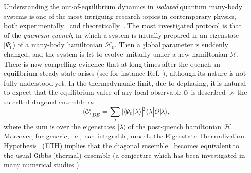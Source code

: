 \documentclass[11pt]{iopart}
\begin{document}
Understanding the out-of-equilibrium dynamics in {\it isolated} quantum 
many-body systems is one of the most intriguing research topics in 
contemporary physics, both experimentally~\cite{bloch-2008,greiner-2002,
kinoshita-2006,hofferberth-2007,trotzky-2012,gring-2012,cheneau-2012,
schneider-2012,kunhert-2013,langen-2013,meinert-2013,fukuhara-2013,
ronzheimer-2013,braun-2014,langen-2015} and theoretically~\cite{polkovnikov-2011,efg-15}. 
The most investigated protocol is that of the {\it quantum quench}, in 
which a system is initially prepared in an eigenstate $|\Psi_0\rangle$ of 
a many-body hamiltonian ${\mathcal H}_0$. Then a global parameter is 
suddenly changed, and the system is let to evolve unitarily under a new 
hamiltonian ${\mathcal H}$. There is now compelling evidence that at long 
times after the quench an equilibrium steady state arises (see for instance 
Ref.~\cite{kinoshita-2006}), although its nature is not fully understood yet. 
In the thermodynamic limit, due to dephasing, it is natural to expect that 
the equilibrium value of any local observable ${\mathcal O}$ is described 
by the so-called diagonal ensemble as 
%
\begin{equation}
\label{d-ensemble}
\langle{\mathcal O}\rangle_{DE}=\sum\limits_{\lambda}|\langle\Psi_0|\lambda
\rangle|^2\langle\lambda|{\mathcal O}|\lambda\rangle,
\end{equation}
%
where the sum is over the eigenstates $|\lambda\rangle$ of the post-quench 
hamiltonian ${\mathcal H}$. Moreover, for generic, i.e., non-integrable, models 
the Eigenstate Thermalization Hypothesis~\cite{deutsch-1991,srednicki-1994} 
(ETH) implies that the diagonal ensemble~ becomes equivalent 
to the usual Gibbs (thermal) ensemble (a conjecture which has been investigated 
in many numerical studies \cite{tvar,alba-2015a}). 
\end{document}
